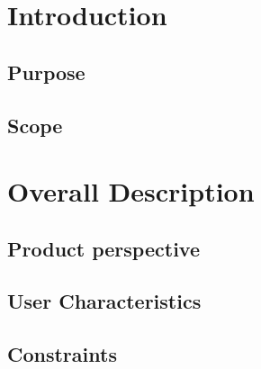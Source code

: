 \documentclass[12pt]{report}
\begin{document}
    
  \begin{titlepage}
    
  \end{titlepage}
  
  \tableofcontents
   
  \chapter{Introduction}
  \section{Purpose}
  
  \section{Scope}
  
  
  \chapter{Overall Description}
  \section{Product perspective}
  
  \section{User Characteristics}
  
  \section{Constraints}
  
\end{document}
